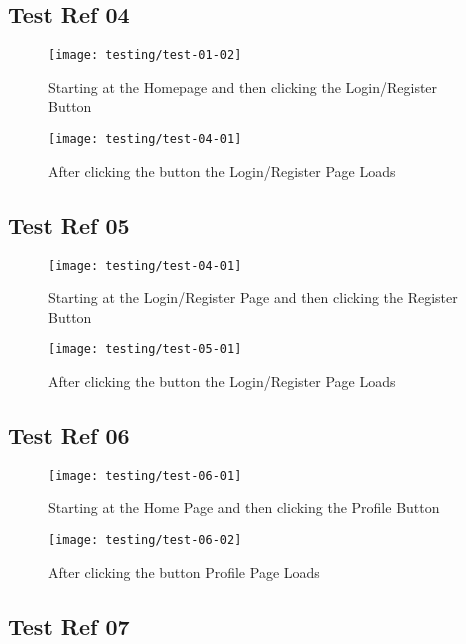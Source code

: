 \subsection{Test Ref 04}

\begin{figure}[H]
\centering
\texttt{[image: testing/test-01-02]}
\caption{Starting at the Homepage and then clicking the Login/Register Button}
\label{test-04-01}
\end{figure}

\begin{figure}[H]
\centering
\texttt{[image: testing/test-04-01]}
\caption{After clicking the button the Login/Register Page Loads}
\label{test-04-02}
\end{figure}

\subsection{Test Ref 05}

\begin{figure}[H]
\centering
\texttt{[image: testing/test-04-01]}
\caption{Starting at the Login/Register Page and then clicking the Register Button}
\label{test-05-01}
\end{figure}

\begin{figure}[H]
\centering
\texttt{[image: testing/test-05-01]}
\caption{After clicking the button the Login/Register Page Loads}
\label{test-05-02}
\end{figure}

\subsection{Test Ref 06}

\begin{figure}[H]
\centering
\texttt{[image: testing/test-06-01]}
\caption{Starting at the Home Page and then clicking the Profile Button}
\label{test-06-01}
\end{figure}

\begin{figure}[H]
\centering
\texttt{[image: testing/test-06-02]}
\caption{After clicking the button Profile Page Loads}
\label{test-06-02}
\end{figure}

\subsection{Test Ref 07}

